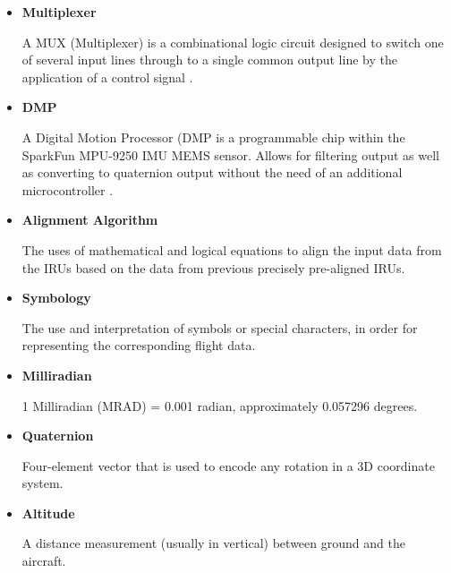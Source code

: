 \begin{itemize}
 	\item \textbf{Multiplexer}
 	\begin{adjustwidth}{2.5em}{0pt}
	A MUX (Multiplexer) is a combinational logic circuit designed to switch one of several input lines through to a single common output line by the application of a control signal \cite{mux}.
	\\
 	\end{adjustwidth}

 	\item \textbf{DMP}
 	\begin{adjustwidth}{2.5em}{0pt}
	A Digital Motion Processor (DMP is a programmable chip within the SparkFun MPU-9250 IMU MEMS sensor. Allows for filtering output as well as converting to quaternion output without the need of an additional microcontroller \cite{dmp}.
	\\
 	\end{adjustwidth}

 	\item \textbf{Alignment Algorithm}
 	\begin{adjustwidth}{2.5em}{0pt}
	The uses of mathematical and logical equations to align the input data from the IRUs based on the data from previous precisely pre-aligned IRUs.
	\\
 	\end{adjustwidth}

 	\item \textbf{Symbology}
 	\begin{adjustwidth}{2.5em}{0pt}
	The use and interpretation of symbols or special characters, in order for representing the corresponding flight data.
	\\
 	\end{adjustwidth}

 	\item \textbf{Milliradian}
 	\begin{adjustwidth}{2.5em}{0pt}
	1 Milliradian (MRAD) = 0.001 radian, approximately 0.057296 degrees.
	\\
 	\end{adjustwidth}

 	\item \textbf{Quaternion}
 	\begin{adjustwidth}{2.5em}{0pt}
	Four-element vector that is used to encode any rotation in a 3D coordinate system.
	\\
 	\end{adjustwidth}

 	\item \textbf{Altitude}
 	\begin{adjustwidth}{2.5em}{0pt}
	A distance measurement (usually in vertical) between ground and the aircraft.
	\\
 	\end{adjustwidth}


\end{itemize}
